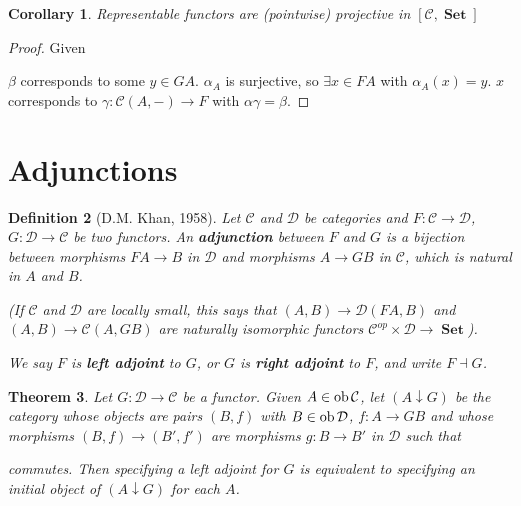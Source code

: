 \documentclass[a4paper]{article}
\newtheorem{definition}{Definition}
\newtheorem{corollary}[definition]{Corollary}
\newtheorem{theorem}[definition]{Theorem}
\numberwithin{definition}{section}
\newcommand*\ob[1]{\textnormal{ob}\,#1}
\DeclareMathOperator{\Set}{\textbf{Set}}
\begin{document}
\begin{corollary}
	Representable functors are (pointwise) projective in $[\mathcal{C}, \Set]$
\end{corollary}
\begin{proof}
	Given
	\begin{center}
	\end{center}
	$\beta$ corresponds to some $y \in GA$. 
	$\alpha_A$ is surjective, so $\exists x \in FA$ with $\alpha_A(x)=y$.
	$x$ corresponds to $\gamma: \mathcal{C}(A, -) \to F$ with $\alpha\gamma = \beta$.
\end{proof}

\section{Adjunctions}
\begin{definition}[D.M. Khan, 1958]
	Let $\mathcal{C}$ and $\mathcal{D}$ be categories and $F: \mathcal{C} \to \mathcal{D}$, $G: \mathcal{D} \to \mathcal{C}$ be two functors.
	An \textbf{adjunction} between $F$ and $G$ is a bijection between morphisms $FA \to B$ in $\mathcal{D}$ and morphisms $A \to GB$ in $\mathcal{C}$, 
	which is natural in $A$ and $B$.

	(If $\mathcal{C}$ and $\mathcal{D}$ are locally small,
	this says that $(A, B) \to \mathcal{D}(FA, B)$ and $(A, B) \to \mathcal{C}(A, GB)$
	are naturally isomorphic functors $\mathcal{C}^{op} \times \mathcal{D} \to \Set$).
	
	We say $F$ is \textbf{left adjoint} to $G$,
	or $G$ is \textbf{right adjoint} to $F$,
	and write $F \dashv G$.
\end{definition}

\begin{theorem}
	Let $G: \mathcal{D} \to \mathcal{C}$ be a functor.
	Given $A \in \ob \mathcal{C}$,
	let $(A \downarrow G)$ be the category whose objects are pairs $(B, f)$
	with $B \in \ob \mathcal{D}$,
	$f: A \to GB$ and whose morphisms $(B, f) \to (B', f')$
	are morphisms $g: B \to B'$ in $\mathcal{D}$ such that
	\begin{center}
	\end{center}
	commutes.
	Then specifying a left adjoint for $G$ is equivalent to specifying an initial object of $(A \downarrow G)$ for each $A$.
	\label{33}
\end{theorem}
\end{document}
